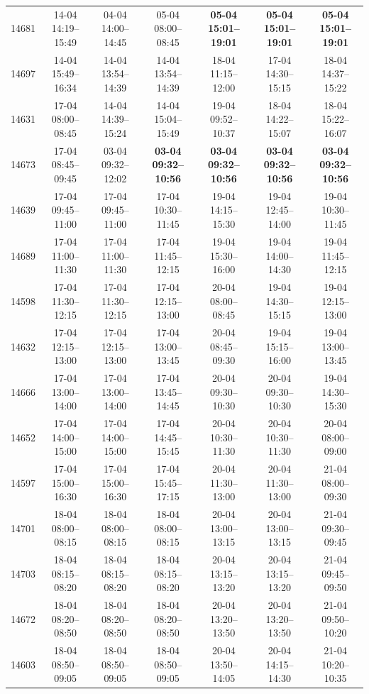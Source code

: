 \begin{table}[htbp]
\begin{tabular}{|r|c|c|c|c|c|c|}
14681 & 14-04 14:19--15:49 & 04-04 14:00--14:45 & 05-04 08:00--08:45 & \textbf{05-04 15:01--19:01} & \textbf{05-04 15:01--19:01} & \textbf{05-04 15:01--19:01} \\ 
14697 & 14-04 15:49--16:34 & 14-04 13:54--14:39 & 14-04 13:54--14:39 & 18-04 11:15--12:00 & 17-04 14:30--15:15 & 18-04 14:37--15:22 \\ 
14631 & 17-04 08:00--08:45 & 14-04 14:39--15:24 & 14-04 15:04--15:49 & 19-04 09:52--10:37 & 18-04 14:22--15:07 & 18-04 15:22--16:07 \\ 
14673 & 17-04 08:45--09:45 & 03-04 09:32--12:02 & \textbf{03-04 09:32--10:56} & \textbf{03-04 09:32--10:56} & \textbf{03-04 09:32--10:56} & \textbf{03-04 09:32--10:56} \\ 
14639 & 17-04 09:45--11:00 & 17-04 09:45--11:00 & 17-04 10:30--11:45 & 19-04 14:15--15:30 & 19-04 12:45--14:00 & 19-04 10:30--11:45 \\ 
14689 & 17-04 11:00--11:30 & 17-04 11:00--11:30 & 17-04 11:45--12:15 & 19-04 15:30--16:00 & 19-04 14:00--14:30 & 19-04 11:45--12:15 \\ 
14598 & 17-04 11:30--12:15 & 17-04 11:30--12:15 & 17-04 12:15--13:00 & 20-04 08:00--08:45 & 19-04 14:30--15:15 & 19-04 12:15--13:00 \\ 
14632 & 17-04 12:15--13:00 & 17-04 12:15--13:00 & 17-04 13:00--13:45 & 20-04 08:45--09:30 & 19-04 15:15--16:00 & 19-04 13:00--13:45 \\ 
14666 & 17-04 13:00--14:00 & 17-04 13:00--14:00 & 17-04 13:45--14:45 & 20-04 09:30--10:30 & 20-04 09:30--10:30 & 19-04 14:30--15:30 \\ 
14652 & 17-04 14:00--15:00 & 17-04 14:00--15:00 & 17-04 14:45--15:45 & 20-04 10:30--11:30 & 20-04 10:30--11:30 & 20-04 08:00--09:00 \\ 
14597 & 17-04 15:00--16:30 & 17-04 15:00--16:30 & 17-04 15:45--17:15 & 20-04 11:30--13:00 & 20-04 11:30--13:00 & 21-04 08:00--09:30 \\ 
14701 & 18-04 08:00--08:15 & 18-04 08:00--08:15 & 18-04 08:00--08:15 & 20-04 13:00--13:15 & 20-04 13:00--13:15 & 21-04 09:30--09:45 \\ 
14703 & 18-04 08:15--08:20 & 18-04 08:15--08:20 & 18-04 08:15--08:20 & 20-04 13:15--13:20 & 20-04 13:15--13:20 & 21-04 09:45--09:50 \\ 
14672 & 18-04 08:20--08:50 & 18-04 08:20--08:50 & 18-04 08:20--08:50 & 20-04 13:20--13:50 & 20-04 13:20--13:50 & 21-04 09:50--10:20 \\ 
14603 & 18-04 08:50--09:05 & 18-04 08:50--09:05 & 18-04 08:50--09:05 & 20-04 13:50--14:05 & 20-04 14:15--14:30 & 21-04 10:20--10:35 \\ 

\end{tabular}
\end{table}
